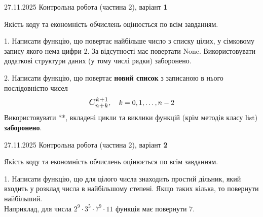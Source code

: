 \documentclass[11pt, ukrainian]{article}
\begin{document}
{{27.11.2025 Контрольна робота  (частина 2), варіант  \No \textbf { 1 }\par}}


{
\begin {large}
Якість коду та економність обчислень оцінюється по всім завданням.


1. Написати функцію, що повертає найбільше число з списку цілих, у сімковому запису якого нема цифри 2. За відсутності має повертати None. Використовувати додаткові структури даних (у тому числі рядки) заборонено.


2. 
Написати функцію, що повертає \textbf{новий список} з записаною в нього послідовністю чисел
$$\scalebox{1.2}{$C_{n+k}^{k+1}$}, \quad k=0,1,\ldots,n-2$$
Використовувати **, вкладені цикли та виклики функцій (крім методів класу list) \textbf{заборонено}.

\end{large}
\newpage
{{27.11.2025 Контрольна робота  (частина 2), варіант  \No \textbf { 2 }\par}}


{
\begin {large}
Якість коду та економність обчислень оцінюється по всім завданням.


1. Написати функцію, що для цілого числа знаходить простий дільник, який входить у розклад числа в найбільшому степені. Якщо таких кілька, то повернути найбільший. \\ Наприклад, для числа $2^{9}{\cdot}3^5{\cdot}7^9{\cdot}11$ функція має повернути $7$.



\end{large}}}
\end{document}
